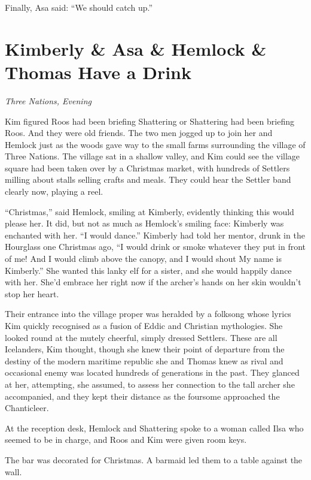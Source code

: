 \documentclass[11pt,a5paper]{article}
\newcommand{\alet}[1]{\textit{#1}\vspace{1em}}
\begin{document}
Finally, Asa said: ``We should catch up.''

\newpage

\section{Kimberly \& Asa \& Hemlock \& Thomas Have a Drink}

\alet{Three Nations, Evening}



Kim figured Roos had been briefing Shattering or Shattering had been briefing Roos. And they were old friends. The two men jogged up to join her and Hemlock just as the woods gave way to the small farms surrounding the village of Three Nations. The village sat in a shallow valley, and Kim could see the village square had been taken over by a Christmas market, with hundreds of Settlers milling about stalls selling crafts and meals. They could hear the Settler band clearly now, playing a reel.

``Christmas,'' said Hemlock, smiling at Kimberly, evidently thinking this would please her. It did, but not as much as Hemlock's smiling face: Kimberly was enchanted with her. ``I would dance.'' Kimberly had told her mentor, drunk in the Hourglass one Christmas ago, ``I would drink or smoke whatever they put in front of me! And I would climb above the canopy, and I would shout My name is Kimberly.'' She wanted this lanky elf for a sister, and she would happily dance with her. She'd embrace her right now if the archer's hands on her skin wouldn't stop her heart.

Their entrance into the village proper was heralded by a folksong whose lyrics Kim quickly recognised as a fusion of Eddic and Christian mythologies. She looked round at the mutely cheerful, simply dressed Settlers. These are all Icelanders, Kim thought, though she knew their point of departure from the destiny of the modern maritime republic she and Thomas knew as rival and occasional enemy was located hundreds of generations in the past. They glanced at her, attempting, she assumed, to assess her connection to the tall archer she accompanied, and they kept their distance as the foursome approached the Chanticleer.

At the reception desk, Hemlock and Shattering spoke to a woman called Ilsa who seemed to be in charge, and Roos and Kim were given room keys.

The bar was decorated for Christmas. A barmaid led them to a table against the wall.
\end{document}
